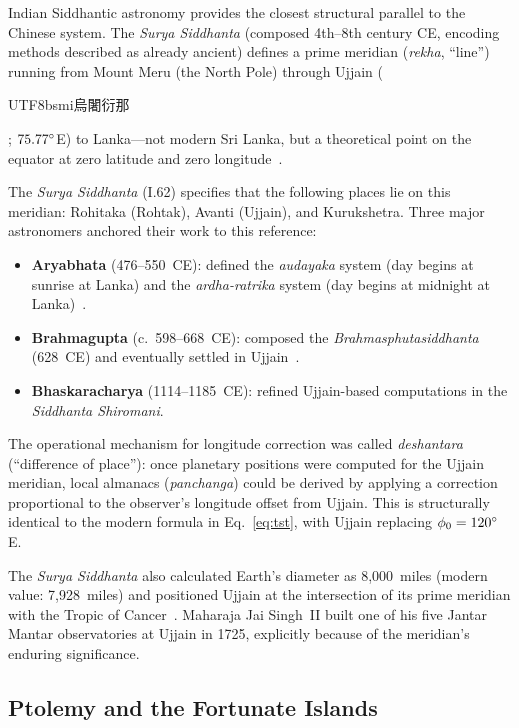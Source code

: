 \documentclass[10pt,a4paper]{article}
\newcommand{\zh}[1]{\begin{CJK}{UTF8}{bsmi}#1\end{CJK}}
\begin{document}
Indian Siddhantic astronomy provides the closest structural parallel to
the Chinese system. The \textit{Surya Siddhanta} (composed 4th--8th century
CE, encoding methods described as already ancient) defines a prime meridian
(\textit{rekha}, ``line'') running from Mount Meru (the North Pole) through
Ujjain (\zh{烏闍衍那}; $75.77\degree$E) to Lanka---not modern Sri Lanka,
but a theoretical point on the equator at zero latitude and zero
longitude~\cite{burgess1860}.

The \textit{Surya Siddhanta} (I.62) specifies that the following places
lie on this meridian: Rohitaka (Rohtak), Avanti (Ujjain), and Kurukshetra.
Three major astronomers anchored their work to this reference:

\begin{itemize}[nosep]
  \item \textbf{Aryabhata} (476--550~CE): defined the \textit{audayaka}
    system (day begins at sunrise at Lanka) and the \textit{ardha-ratrika}
    system (day begins at midnight at Lanka)~\cite{shukla1976}.
  \item \textbf{Brahmagupta} (c.~598--668~CE): composed the
    \textit{Brahmasphutasiddhanta} (628~CE) and eventually settled in
    Ujjain~\cite{plofker2009}.
  \item \textbf{Bhaskaracharya} (1114--1185~CE): refined Ujjain-based
    computations in the \textit{Siddhanta Shiromani}.
\end{itemize}

The operational mechanism for longitude correction was called
\textit{deshantara} (``difference of place''): once planetary positions were
computed for the Ujjain meridian, local almanacs (\textit{panchanga}) could be
derived by applying a correction proportional to the observer's longitude
offset from Ujjain. This is structurally identical to the modern formula
in Eq.~\eqref{eq:tst}, with Ujjain replacing $\phi_0 = 120\degree$E.

The \textit{Surya Siddhanta} also calculated Earth's diameter as 8,000~miles
(modern value: 7,928~miles) and positioned Ujjain at the intersection of
its prime meridian with the Tropic of Cancer~\cite{burgess1860}. Maharaja
Jai Singh~II built one of his five Jantar Mantar observatories at Ujjain
in 1725, explicitly because of the meridian's enduring significance.

\subsection{Ptolemy and the Fortunate Islands}
\label{subsec:ptolemy}
\end{document}
